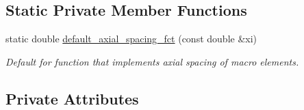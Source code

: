 \subsection*{Static Private Member Functions}
\begin{DoxyCompactItemize}
\item 
static double \hyperlink{classoomph_1_1CollapsibleChannelDomain_a3c814ed3312790877d193d4a018c30da}{default\+\_\+axial\+\_\+spacing\+\_\+fct} (const double \&xi)
\begin{DoxyCompactList}\small\item\em Default for function that implements axial spacing of macro elements. \end{DoxyCompactList}\end{DoxyCompactItemize}
\subsection*{Private Attributes}
